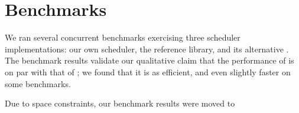 \section{Benchmarks}
\label{sec:benchmarks}

We ran several concurrent benchmarks exercising three scheduler implementations: our own \Parabs scheduler, the reference \Domainslib library, and its alternative \Moonpool. The benchmark results validate our qualitative claim that the performance of \Parabs is on par with that of \Domainslib; we found that it is as efficient, and even slightly faster on some benchmarks.

Due to space constraints, our benchmark results were moved to
